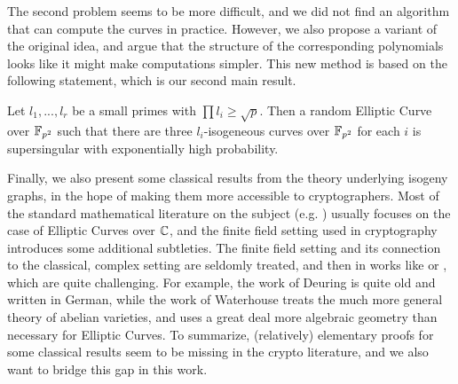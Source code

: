 The second problem seems to be more difficult, and we did not find an algorithm that can compute the curves in practice.
However, we also propose a variant of the original idea, and argue that the structure of the corresponding polynomials looks like it might make computations simpler.
This new method is based on the following statement, which is our second main result.
\begin{prop}
    Let $l_1, ..., l_r$ be a small primes with $\prod l_i \geq \sqrt{p}$.
    Then a random Elliptic Curve over $\mathbb{F}_{p^2}$ such that there are three $l_i$-isogeneous curves over $\mathbb{F}_{p^2}$ for each $i$ is supersingular with exponentially high probability.
\end{prop}
Finally, we also present some classical results from the theory underlying isogeny graphs, in the hope of making them more accessible to cryptographers.
Most of the standard mathematical literature on the subject (e.g. \cite{cox_primes_of_form}) usually focuses on the case of Elliptic Curves over $\mathbb{C}$, and the finite field setting used in cryptography introduces some additional subtleties.
The finite field setting and its connection to the classical, complex setting are seldomly treated, and then in works like \cite{deuring_endomorphism_rings} or \cite{class_group_action_waterhouse}, which are quite challenging.
For example, the work of Deuring \cite{deuring_endomorphism_rings} is quite old and written in German, while the work of Waterhouse \cite{class_group_action_waterhouse} treats the much more general theory of abelian varieties, and uses a great deal more algebraic geometry than necessary for Elliptic Curves. 
To summarize, (relatively) elementary proofs for some classical results seem to be missing in the crypto literature, and we also want to bridge this gap in this work.